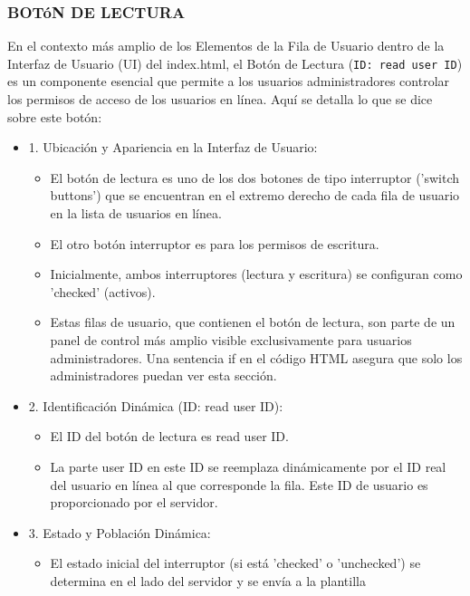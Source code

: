 \documentclass{report}
\begin{document}
\subsubsection{BOTóN DE LECTURA}
En el contexto más amplio de los Elementos de la Fila de Usuario dentro de la Interfaz de Usuario (UI) del index.html, el Botón de 
Lectura (\verb|ID: read user ID|) es un componente esencial que permite a los usuarios administradores controlar los permisos de acceso de 
los usuarios en línea.
Aquí se detalla lo que se dice sobre este botón:
\begin{itemize}
    \item 1. Ubicación y Apariencia en la Interfaz de Usuario:
        \begin{itemize}
            \item El botón de lectura es uno de los dos botones de tipo interruptor ('switch buttons') que se encuentran en el extremo 
            derecho de cada fila de usuario en la lista de usuarios en línea.
            \item El otro botón interruptor es para los permisos de escritura.
            \item Inicialmente, ambos interruptores (lectura y escritura) se configuran como 'checked' (activos).
            \item Estas filas de usuario, que contienen el botón de lectura, son parte de un panel de control más amplio visible exclusivamente 
            para usuarios administradores. Una sentencia if en el código HTML asegura que solo los administradores puedan ver esta sección.        
        \end{itemize}
    \item 2. Identificación Dinámica (ID: read user ID):
        \begin{itemize}
            \item El ID del botón de lectura es read user ID.
            \item La parte user ID en este ID se reemplaza dinámicamente por el ID real del usuario en línea al que corresponde la fila. Este ID 
            de usuario es proporcionado por el servidor.        
        \end{itemize}
    \item 3. Estado y Población Dinámica:
        \begin{itemize}
            \item El estado inicial del interruptor (si está 'checked' o 'unchecked') se determina en el lado del servidor y se envía a la plantilla 

\end{itemize}
\end{itemize}
\end{document}
